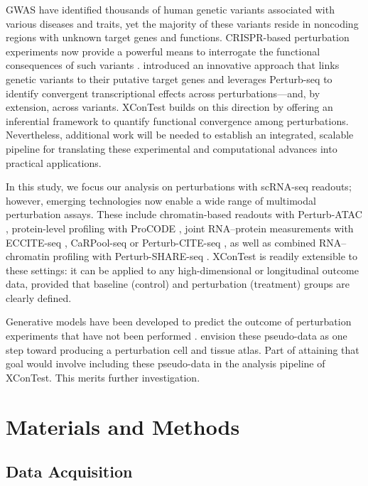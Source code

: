 \documentclass[11pt]{article}
\begin{document}
GWAS have identified thousands of human genetic variants associated with various diseases and traits, yet the majority of these variants reside in noncoding regions with unknown target genes and functions. CRISPR-based perturbation experiments now provide a powerful means to interrogate the functional consequences of such variants \citep{morris2023discovery}. \cite{schnitzler2024convergence} introduced an innovative approach that links genetic variants to their putative target genes and leverages Perturb-seq to identify convergent transcriptional effects across perturbations---and, by extension, across variants. XConTest builds on this direction by offering an inferential framework to quantify functional convergence among perturbations. Nevertheless, additional work will be needed to establish an integrated, scalable pipeline for translating these experimental and computational advances into practical applications.

In this study, we focus our analysis on perturbations with scRNA-seq readouts; however, emerging technologies now enable a wide range of multimodal perturbation assays. These include chromatin-based readouts with Perturb-ATAC \citep{adamson2016multiplexed}, protein-level profiling with ProCODE \citep{wroblewska2018protein}, joint RNA–protein measurements with ECCITE-seq \citep{Papalexi2021}, CaRPool-seq \citep{wessels2023efficient} or Perturb-CITE-seq \citep{Frangieh:2021}, as well as combined RNA–chromatin profiling with Perturb-SHARE-seq \citep{otto2023structural}. XConTest is readily extensible to these settings: it can be applied to any high-dimensional or longitudinal outcome data, provided that baseline (control) and perturbation (treatment) groups are clearly defined.

Generative models have been developed to predict the outcome of perturbation experiments that have not been performed \citep{GEARS,scGPT,shang2025predicting}.  \cite{rood2024toward} envision these pseudo-data as one step toward producing a perturbation cell and tissue atlas. Part of attaining that goal would involve including these pseudo-data in the analysis pipeline of XConTest.  This merits further investigation. 

\section*{Materials and Methods}
\subsection*{Data Acquisition}
\end{document}
